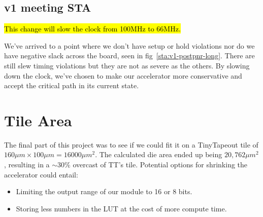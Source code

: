 \documentclass[a4paper]{report}
\begin{document}
				\newpage
				\section{v1 meeting STA}

					

					\hl{This change will slow the clock from 100MHz to 66MHz.}

					

					

					\newpage
					

					We've arrived to a point where we don't have setup or
					hold violations nor do we have negative slack across the
					board, seen in fig~\ref{sta:v1-postpnr-long}. There are still
					slew timing violations but they are not as severe as the
					others. By slowing down the clock, we've chosen to make our
					accelerator more conservative and accept the critical path
					in its current state. 

			\chapter{Tile Area}
				The final part of this project was to see if we could
				fit it on a TinyTapeout tile of $160\mu m \times 100\mu m = 16000\mu m^2$. 
				The calculated die area ended up being $20,762\mu m^2$, resulting
				in a  $\sim30\%$ overcast of TT's tile. Potential options for
				shrinking the accelerator could entail:
				 \begin{itemize}
					\item Limiting the output range of our module to 16 or 8 bits.
					\item Storing less numbers in the LUT at the cost of more compute time.
				\end{itemize}
\end{document}
